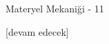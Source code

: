 \documentclass[12pt,fleqn]{article}\usepackage{../../common}
\begin{document}
Materyel Mekaniği - 11


















[devam edecek]
\end{document}
